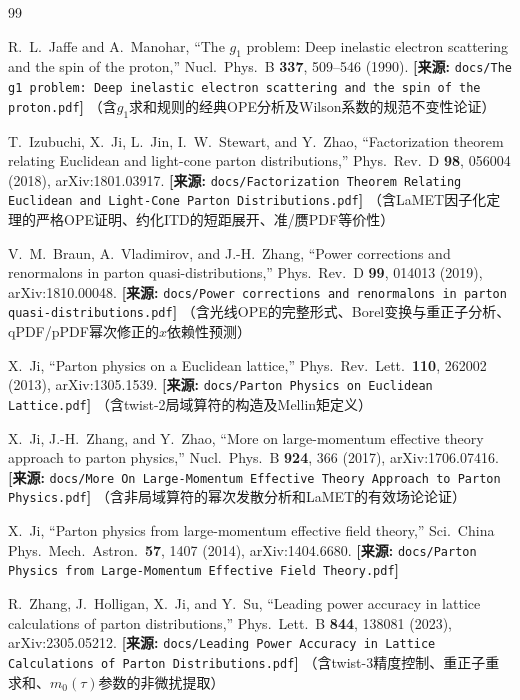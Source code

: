 \documentclass[12pt,a4paper]{ctexart}
\theoremstyle{definition}
\begin{document}
\begin{thebibliography}{99}

R.~L.~Jaffe and A.~Manohar,
``The $g_1$ problem: Deep inelastic electron scattering and the spin of the proton,''
Nucl.\ Phys.\ B \textbf{337}, 509--546 (1990).
\quad\textbf{[来源:} \texttt{docs/The g1 problem: Deep inelastic electron scattering and the spin of the proton.pdf}\textbf{]}
（含$g_1$求和规则的经典OPE分析及Wilson系数的规范不变性论证）

T.~Izubuchi, X.~Ji, L.~Jin, I.~W.~Stewart, and Y.~Zhao,
``Factorization theorem relating Euclidean and light-cone parton distributions,''
Phys.\ Rev.\ D \textbf{98}, 056004 (2018), arXiv:1801.03917.
\quad\textbf{[来源:} \texttt{docs/Factorization Theorem Relating Euclidean and Light-Cone Parton Distributions.pdf}\textbf{]}
（含LaMET因子化定理的严格OPE证明、约化ITD的短距展开、准/赝PDF等价性）

V.~M.~Braun, A.~Vladimirov, and J.-H.~Zhang,
``Power corrections and renormalons in parton quasi-distributions,''
Phys.\ Rev.\ D \textbf{99}, 014013 (2019), arXiv:1810.00048.
\quad\textbf{[来源:} \texttt{docs/Power corrections and renormalons in parton quasi-distributions.pdf}\textbf{]}
（含光线OPE的完整形式、Borel变换与重正子分析、qPDF/pPDF幂次修正的$x$依赖性预测）

X.~Ji,
``Parton physics on a Euclidean lattice,''
Phys.\ Rev.\ Lett.\ \textbf{110}, 262002 (2013), arXiv:1305.1539.
\quad\textbf{[来源:} \texttt{docs/Parton Physics on Euclidean Lattice.pdf}\textbf{]}
（含twist-2局域算符的构造及Mellin矩定义）

X.~Ji, J.-H.~Zhang, and Y.~Zhao,
``More on large-momentum effective theory approach to parton physics,''
Nucl.\ Phys.\ B \textbf{924}, 366 (2017), arXiv:1706.07416.
\quad\textbf{[来源:} \texttt{docs/More On Large-Momentum Effective Theory Approach to Parton Physics.pdf}\textbf{]}
（含非局域算符的幂次发散分析和LaMET的有效场论论证）

X.~Ji,
``Parton physics from large-momentum effective field theory,''
Sci.\ China Phys.\ Mech.\ Astron.\ \textbf{57}, 1407 (2014), arXiv:1404.6680.
\quad\textbf{[来源:} \texttt{docs/Parton Physics from Large-Momentum Effective Field Theory.pdf}\textbf{]}

R.~Zhang, J.~Holligan, X.~Ji, and Y.~Su,
``Leading power accuracy in lattice calculations of parton distributions,''
Phys.\ Lett.\ B \textbf{844}, 138081 (2023), arXiv:2305.05212.
\quad\textbf{[来源:} \texttt{docs/Leading Power Accuracy in Lattice Calculations of Parton Distributions.pdf}\textbf{]}
（含twist-3精度控制、重正子重求和、$m_0(\tau)$参数的非微扰提取）


\end{thebibliography}
\end{document}
